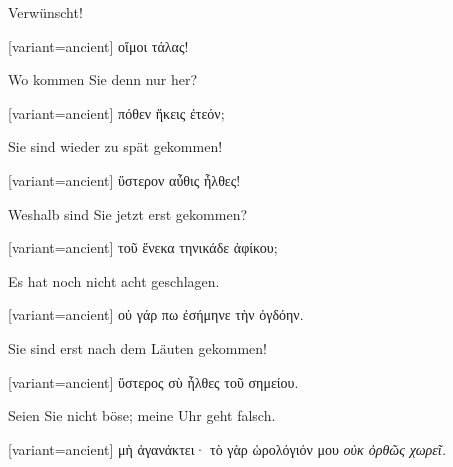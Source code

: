 Verwünscht!

\switchcolumn

\begin{greek}[variant=ancient]%
οἴμοι τάλας!

\end{greek}%
\switchcolumn*

Wo kommen Sie denn nur her?

\switchcolumn

\begin{greek}[variant=ancient]%
πόθεν ἥκεις ἐτεόν;

\end{greek}%
\switchcolumn*

Sie sind wieder zu spät gekommen!

\switchcolumn

\begin{greek}[variant=ancient]%
ὕστερον αὖθις ἦλθες!

\end{greek}%
\switchcolumn*

Wes\textcompwordmark{}halb sind Sie jetzt erst gekommen?

\switchcolumn

\begin{greek}[variant=ancient]%
τοῦ ἕνεκα τηνικάδε ἀφίκου;

\end{greek}%
\switchcolumn*

Es hat noch nicht acht geschlagen.

\switchcolumn

\begin{greek}[variant=ancient]%
οὐ γάρ πω ἐσήμηνε τὴν ὀγδόην.

\end{greek}%
\switchcolumn*

Sie sind erst nach dem Läuten gekommen!

\switchcolumn

\begin{greek}[variant=ancient]%
ὕστερος σὺ ἦλθες τοῦ σημείου.

\end{greek}%
\switchcolumn*

Seien Sie nicht böse; meine Uhr geht falsch.

\switchcolumn

\begin{greek}[variant=ancient]%
μὴ ἀγανάκτει· τὸ γὰρ ὡρολόγιόν μου \emph{οὐκ ὀρθῶς χωρεῖ.}

\end{greek}%
\switchcolumn*

